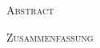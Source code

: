\begin{center}
    \textsc{Abstract}
  \end{center}
  \noindent
 \lipsum[1]


\begin{center}
    \textsc{Zusammenfassung}
  \end{center}

  \noindent
  \lipsum[1]
